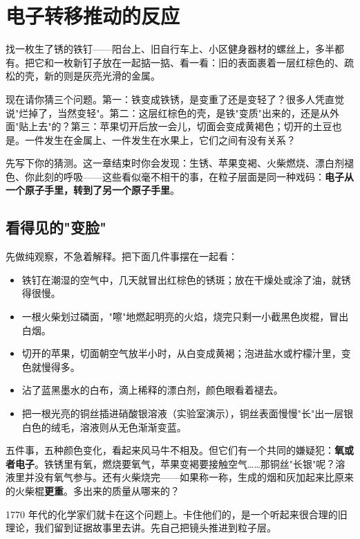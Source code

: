 \chapter{电子转移推动的反应}

\begin{kaichang}
找一枚生了锈的铁钉——阳台上、旧自行车上、小区健身器材的螺丝上，多半都有。把它和一枚新钉子放在一起掂一掂、看一看：旧的表面裹着一层红棕色的、疏松的壳，新的则是灰亮光滑的金属。

现在请你猜三个问题。第一：铁变成铁锈，是变重了还是变轻了？很多人凭直觉说"烂掉了，当然变轻"。第二：这层红棕色的壳，是铁"变质"出来的，还是从外面"贴上去"的？第三：苹果切开后放一会儿，切面会变成黄褐色；切开的土豆也是。一件发生在金属上、一件发生在水果上，它们之间有没有关系？

先写下你的猜测。这一章结束时你会发现：生锈、苹果变褐、火柴燃烧、漂白剂褪色、你此刻的呼吸——这些看似毫不相干的事，在粒子层面是同一种戏码：\textbf{电子从一个原子手里，转到了另一个原子手里}。
\end{kaichang}

\section{看得见的"变脸"}

先做纯观察，不急着解释。把下面几件事摆在一起看：

\begin{itemize}[itemsep=2pt]
\item 铁钉在潮湿的空气中，几天就冒出红棕色的锈斑；放在干燥处或涂了油，就锈得很慢。
\item 一根火柴划过磷面，"嚓"地燃起明亮的火焰，烧完只剩一小截黑色炭棍，冒出白烟。
\item 切开的苹果，切面朝空气放半小时，从白变成黄褐；泡进盐水或柠檬汁里，变色就慢得多。
\item 沾了蓝黑墨水的白布，滴上稀释的漂白剂，颜色眼看着褪去。
\item 把一根光亮的铜丝插进硝酸银溶液（实验室演示），铜丝表面慢慢"长"出一层银白色的绒毛，溶液则从无色渐渐变蓝。
\end{itemize}

五件事，五种颜色变化，看起来风马牛不相及。但它们有一个共同的嫌疑犯：\textbf{氧或者电子}。铁锈里有氧，燃烧要氧气，苹果变褐要接触空气……那铜丝"长银"呢？溶液里并没有氧气参与。还有火柴烧完——如果称一称，生成的烟和灰加起来比原来的火柴棍\textbf{更重}。多出来的质量从哪来的？

1770 年代的化学家们就卡在这个问题上。卡住他们的，是一个听起来很合理的旧理论，我们留到证据故事里去讲。先自己把镜头推进到粒子层。

